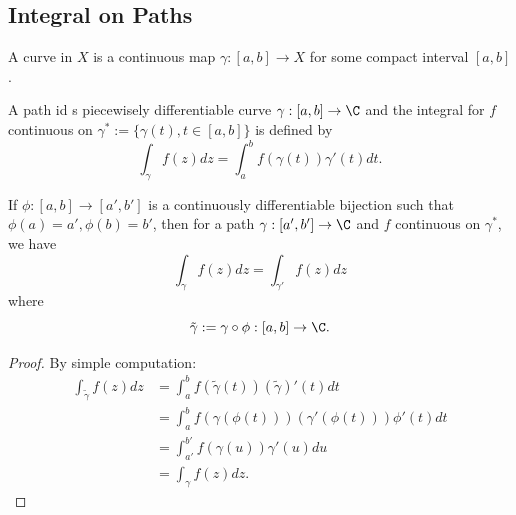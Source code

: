 \subsection{Integral on Paths}

\begin{definition}
     A curve in $X$ is a continuous map $\gamma:[a,b] \to X$ for some compact interval $[a,b]$.\par
    A path id s piecewisely differentiable curve $\gamma:[a,b] \to \C$ and the integral for $f$ continuous on $\gamma^*:= \{\gamma(t), t\in [a,b]\}$ is defined by
    \[
    \int_{\gamma}f(z)dz = \int_a^b f(\gamma(t))\gamma'(t)dt.
    \]
\end{definition}

\begin{lemma}
    If $\phi:[a,b] \to [a',b']$ is a continuously differentiable bijection such that $\phi(a) = a', \phi(b) = b'$, then for a path $\gamma:[a',b'] \to \C$ and $f$ continuous on $\gamma^*$, we have
    \[
    \int_{\gamma} f(z)dz = \int_{\gamma'}f(z)dz
    \]
    where
    \[\tilde{\gamma} := \gamma\circ \phi:[a,b] \to \C.\]
\end{lemma}
\begin{proof}
    By simple computation:
    \[
    \begin{aligned}
        \int_{\tilde{\gamma}}f(z)dz &= \int_a^b f(\tilde{\gamma}(t))(\tilde{\gamma})'(t)dt \\
        &= \int_a^b f(\gamma(\phi(t)))(\gamma'(\phi(t)))\phi'(t)dt \\
        &= \int_{a'}^{b'}f(\gamma(u))\gamma'(u)du \\
        &= \int_{\gamma}f(z)dz.
    \end{aligned}
    \]
\end{proof}

